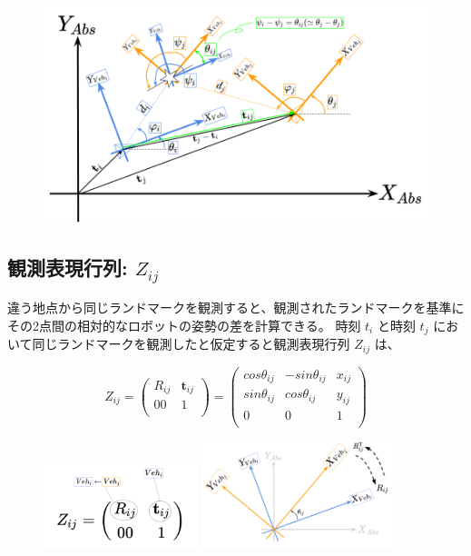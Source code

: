 \documentclass{article}
\begin{document}
\begin{figure}[h!]
  \centering
  \includegraphics[width=\textwidth]{2-7_sensor_model.png}
\end{figure}

\subsection{観測表現行列: $Z_{ij}$}

違う地点から同じランドマークを観測すると、観測されたランドマークを基準にその2点間の相対的なロボットの姿勢の差を計算できる。
時刻 $t_i$ と時刻 $t_j$ において同じランドマークを観測したと仮定すると観測表現行列 $Z_{ij}$ は、

\[
Z_{ij} =
\left(
  \begin{array}{ccc}
    R_{ij} & \bm{t}_{ij} \\
       00 &              1 \\
  \end{array}
\right)
=
\left(
  \begin{array}{ccc}
    cos\theta_{ij} & -sin\theta_{ij} & x_{ij} \\
    sin\theta_{ij} &  cos\theta_{ij} & y_{ij} \\
                0 &                0 &      1 \\
  \end{array}
\right)
\]

\begin{figure}[h!]
  \centering
  \includegraphics[width=0.4\textwidth]{2-5_observation_representation_matrix.png}
  \includegraphics[width=0.5\textwidth]{2-6_rotation_matrix.png}
\end{figure}
\end{document}
